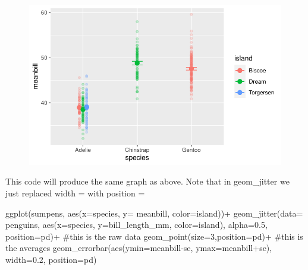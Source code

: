 \documentclass[
  letterpaper,
  DIV=11,
  numbers=noendperiod]{scrartcl}
\newenvironment{Shaded}{\begin{snugshade}}{\end{snugshade}}
\newcommand{\AttributeTok}[1]{\textcolor[rgb]{0.40,0.45,0.13}{#1}}
\newcommand{\CommentTok}[1]{\textcolor[rgb]{0.37,0.37,0.37}{#1}}
\newcommand{\DecValTok}[1]{\textcolor[rgb]{0.68,0.00,0.00}{#1}}
\newcommand{\FloatTok}[1]{\textcolor[rgb]{0.68,0.00,0.00}{#1}}
\newcommand{\FunctionTok}[1]{\textcolor[rgb]{0.28,0.35,0.67}{#1}}
\newcommand{\NormalTok}[1]{\textcolor[rgb]{0.00,0.23,0.31}{#1}}
\newcommand{\SpecialCharTok}[1]{\textcolor[rgb]{0.37,0.37,0.37}{#1}}
\begin{document}
\begin{figure}[H]

{\centering \includegraphics{basic_graphs_files/figure-pdf/unnamed-chunk-20-1.pdf}

}

\end{figure}

This code will produce the same graph as above. Note that in
geom\_jitter we just replaced width = with position =

\begin{Shaded}
\begin{Highlighting}[]
\FunctionTok{ggplot}\NormalTok{(sumpens, }\FunctionTok{aes}\NormalTok{(}\AttributeTok{x=}\NormalTok{species, }\AttributeTok{y=}\NormalTok{ meanbill, }\AttributeTok{color=}\NormalTok{island))}\SpecialCharTok{+}
  \FunctionTok{geom\_jitter}\NormalTok{(}\AttributeTok{data=}\NormalTok{ penguins, }\FunctionTok{aes}\NormalTok{(}\AttributeTok{x=}\NormalTok{species, }\AttributeTok{y=}\NormalTok{bill\_length\_mm, }\AttributeTok{color=}\NormalTok{island), }\AttributeTok{alpha=}\FloatTok{0.5}\NormalTok{, }\AttributeTok{position=}\NormalTok{pd)}\SpecialCharTok{+} \CommentTok{\#this is the raw data}
  \FunctionTok{geom\_point}\NormalTok{(}\AttributeTok{size=}\DecValTok{3}\NormalTok{,}\AttributeTok{position=}\NormalTok{pd)}\SpecialCharTok{+} \CommentTok{\#this is the averages}
  \FunctionTok{geom\_errorbar}\NormalTok{(}\FunctionTok{aes}\NormalTok{(}\AttributeTok{ymin=}\NormalTok{meanbill}\SpecialCharTok{{-}}\NormalTok{se, }\AttributeTok{ymax=}\NormalTok{meanbill}\SpecialCharTok{+}\NormalTok{se), }\AttributeTok{width=}\FloatTok{0.2}\NormalTok{, }\AttributeTok{position=}\NormalTok{pd)}
\end{Highlighting}
\end{Shaded}
\end{document}
